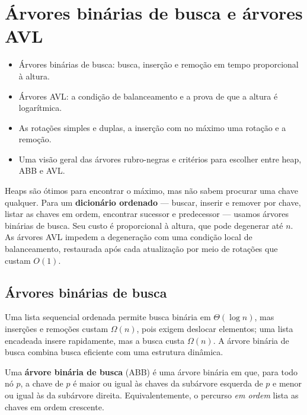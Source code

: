 \chapter{Árvores binárias de busca e árvores AVL}\label{cap:avl}\label{sec:avl}
\begin{objetivos}
\begin{itemize}
  \item Árvores binárias de busca: busca, inserção e remoção em tempo proporcional à altura.
  \item Árvores AVL: a condição de balanceamento e a prova de que a altura é logarítmica.
  \item As rotações simples e duplas, a inserção com no máximo uma rotação e a remoção.
  \item Uma visão geral das árvores rubro-negras e critérios para escolher entre heap, ABB e AVL.
\end{itemize}
\end{objetivos}

Heaps são ótimos para encontrar o máximo, mas não sabem procurar uma chave qualquer. Para um \textbf{dicionário ordenado} --- buscar, inserir e remover por chave, listar as chaves em ordem, encontrar sucessor e predecessor --- usamos árvores binárias de busca. Seu custo é proporcional à altura, que pode degenerar até $n$. As árvores AVL impedem a degeneração com uma condição local de balanceamento, restaurada após cada atualização por meio de rotações que custam $O(1)$.

\section{Árvores binárias de busca}\label{sec:abb}
Uma lista sequencial ordenada permite busca binária em $\Theta(\log n)$, mas inserções e remoções custam $\Omega(n)$, pois exigem deslocar elementos; uma lista encadeada insere rapidamente, mas a busca custa $\Omega(n)$. A árvore binária de busca combina busca eficiente com uma estrutura dinâmica.
\begin{defi}
Uma \textbf{árvore binária de busca} (ABB) é uma árvore binária em que, para todo nó $p$, a chave de $p$ é maior ou igual às chaves da subárvore esquerda de $p$ e menor ou igual às da subárvore direita. Equivalentemente, o percurso \emph{em ordem} lista as chaves em ordem crescente.
\end{defi}

